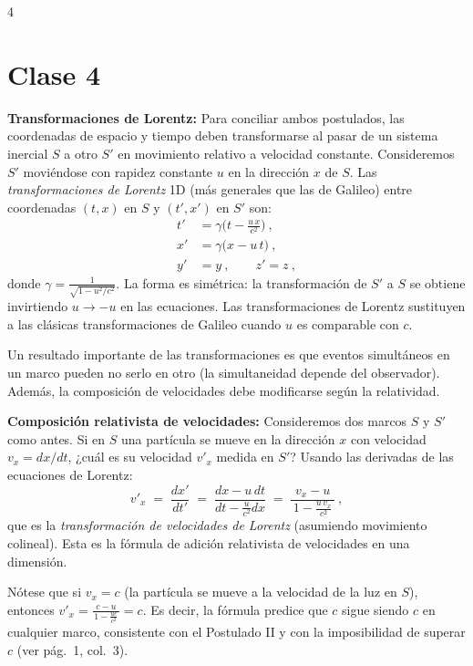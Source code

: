 \documentclass[landscape,10pt]{article}
\begin{document}
\begin{multicols}{4}
\bigskip
\section*{Clase 4}

\noindent \textbf{Transformaciones de Lorentz:} Para conciliar ambos postulados, las coordenadas de espacio y tiempo deben transformarse al pasar de un sistema inercial $S$ a otro $S'$ en movimiento relativo a velocidad constante. Consideremos $S'$ moviéndose con rapidez constante $u$ en la dirección $x$ de $S$. Las \emph{transformaciones de Lorentz} 1D (más generales que las de Galileo) entre coordenadas $(t,x)$ en $S$ y $(t',x')$ en $S'$ son:
\begin{align*}
t' &= \gamma\Big(t - \frac{u\,x}{c^2}\Big)~,\\
x' &= \gamma\big(x - u\,t\big)~,\\
y' &= y~, \qquad z' = z~,
\end{align*}
donde $\gamma = \frac{1}{\sqrt{1 - u^2/c^2}}$. La forma es simétrica: la transformación de $S'$ a $S$ se obtiene invirtiendo $u \to -u$ en las ecuaciones. Las transformaciones de Lorentz sustituyen a las clásicas transformaciones de Galileo cuando $u$ es comparable con $c$.

Un resultado importante de las transformaciones es que eventos simultáneos en un marco pueden no serlo en otro (la simultaneidad depende del observador). Además, la composición de velocidades debe modificarse según la relatividad.

\medskip \noindent \textbf{Composición relativista de velocidades:} Consideremos dos marcos $S$ y $S'$ como antes. Si en $S$ una partícula se mueve en la dirección $x$ con velocidad $v_x = dx/dt$, ¿cuál es su velocidad $v'_{x}$ medida en $S'$? Usando las derivadas de las ecuaciones de Lorentz:
\[
v'_x \;=\; \frac{dx'}{dt'} \;=\; \frac{dx - u\,dt}{dt - \frac{u}{c^2}dx} \;=\; \frac{v_x - u}{\,1 - \frac{u\,v_x}{c^2}\,}~,
\] 
que es la \emph{transformación de velocidades de Lorentz} (asumiendo movimiento colineal). Esta es la fórmula de adición relativista de velocidades en una dimensión.

Nótese que si $v_x = c$ (la partícula se mueve a la velocidad de la luz en $S$), entonces $v'_x = \frac{c - u}{\,1 - \frac{u c}{c^2}\,} = c$. Es decir, la fórmula predice que $c$ sigue siendo $c$ en cualquier marco, consistente con el Postulado II y con la imposibilidad de superar $c$ (ver pág.~1, col.~3).


\end{multicols}
\end{document}
